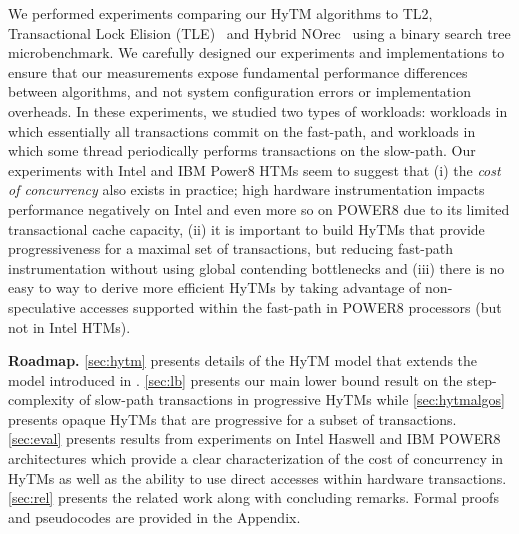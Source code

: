 We performed experiments comparing our HyTM algorithms to TL2, Transactional Lock Elision (TLE)~\cite{tle} and Hybrid NOrec~\cite{hynorecriegel} 
using a binary search tree microbenchmark.
We carefully designed our experiments and implementations to ensure that our measurements expose fundamental performance differences between algorithms, and not system configuration errors or implementation overheads.
In these experiments, we studied two types of workloads: workloads in which essentially all transactions commit on the fast-path, 
and workloads in which some thread periodically performs transactions on the slow-path.
Our experiments with Intel and IBM Power8 HTMs   
seem to suggest that (i) the \emph{cost of concurrency} also exists in practice; high hardware instrumentation impacts performance negatively on Intel and even more so on POWER8 due to its limited transactional
cache capacity, (ii) 
it is important to build HyTMs that provide progressiveness for a maximal set of transactions, but reducing fast-path instrumentation
without using global contending bottlenecks and (iii) 
there is no easy to way to derive more efficient HyTMs by taking advantage of non-speculative accesses supported within the fast-path in POWER8 processors
(but not in Intel HTMs).

\vspace{1mm}\noindent\textbf{Roadmap.}
\cref{sec:hytm} presents details of the HyTM model that extends the model introduced in \cite{htmdisc15}.
\cref{sec:lb} presents our main lower bound result on the step-complexity of slow-path transactions in progressive HyTMs
while \cref{sec:hytmalgos} presents opaque HyTMs that are progressive for a subset of transactions.
\cref{sec:eval} presents results from experiments on Intel Haswell and IBM POWER8 architectures which provide a clear characterization of the cost
of concurrency in HyTMs as well as the ability to use direct accesses within hardware transactions.
\cref{sec:rel} presents the related work along with concluding remarks. Formal proofs and pseudocodes are provided in the Appendix.
%